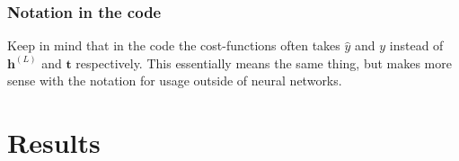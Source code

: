 \documentclass{article}
\begin{document}
\subsubsection{Notation in the code}
Keep in mind that in the code the cost-functions often takes $\hat{y}$ and $y$
instead of $\bm{h}^{(L)}$ and $\bm{t}$ respectively. This essentially means the
same thing, but makes more sense with the notation for usage outside of neural
networks.


\section{Results}


\end{document}
